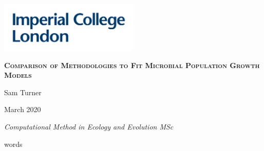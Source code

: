 \documentclass[11pt, a4paper]{article}
\newcommand\wordcount{}
\begin{document}
    \begin{titlepage}
	\centering
	\includegraphics[width=0.5\textwidth]{../data/imperial.png}\par\vspace{1cm}
	\vspace{2cm}
	{\scshape\Large\bfseries Comparison of Methodologies to Fit Microbial Population Growth Models\par}
	\vspace{2cm}
	{\Large Sam Turner\par}
	\vspace{0.5cm}
	{\Large March 2020 \par}
	\vspace{0.5cm}
	{\Large\itshape Computational Method in Ecology and Evolution MSc\par}
	\vspace{0.5cm}
	 \wordcount words 
	\vfill

	\vfill
    
    \newpage
    \end{titlepage}
    
    \begin{abstract}
    The modelling of microbial growth is vital for developing food preservation measures to decrease food waste. By fitting a range of mechanistic and phenomenological models to a large dataset of 305 growth curves, I demonstrate that temperature has a major impact on microbial population dynamics. I also show that model fitting in log space increases the resolution of parameter estimates relative to linear space model fitting, and that different models with equivalent parameterisations can produce systematically biased parameter estimates. This results in recommendations for model fitting, and in particular how to carry out meta analyses where parameter values must be compared between sources.
\end{abstract}
\end{document}
